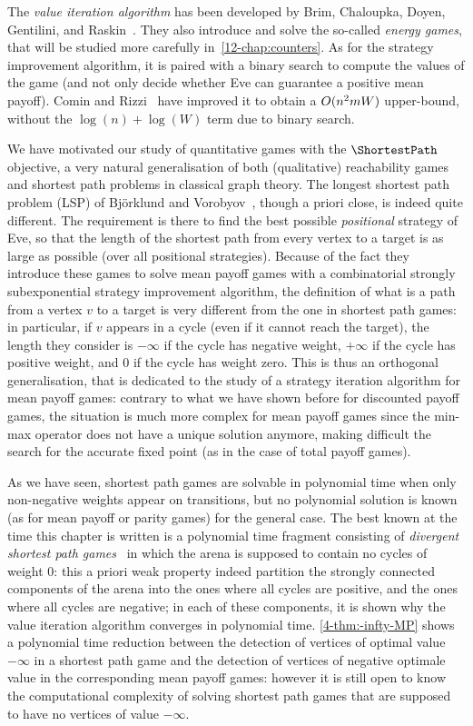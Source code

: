 The \emph{value iteration algorithm} has been developed by Brim,
Chaloupka, Doyen, Gentilini, and
Raskin~\cite{Brim&Chaloupka&Doyen&Gentilini&Raskin:2011}. They also
introduce and solve the so-called \emph{energy games}, that will be
studied more carefully in~\cref{12-chap:counters}. As for the strategy
improvement algorithm, it is paired with a binary search to compute
the values of the game (and not only decide whether Eve can guarantee
a positive mean payoff). Comin and Rizzi~\cite{Comin&Rizzi:2017} have
improved it to obtain a $O(n^2 m W)$ upper-bound, without
the $\log(n)+\log(W)$ term due to binary search.


We have motivated our study of quantitative games with the
$\ShortestPath$ objective, a very natural generalisation of both
(qualitative) reachability games and shortest path problems in
classical graph theory. The longest shortest path problem (LSP) of
Bj\"orklund and Vorobyov~\cite{Bjorklund&Vorobyov:2007}, though a
priori close, is indeed quite different. The requirement is there to
find the best possible \emph{positional} strategy of Eve, so that the
length of the shortest path from every vertex to a target is as large
as possible (over all positional strategies). Because of the fact they
introduce these games to solve mean payoff games with a combinatorial
strongly subexponential strategy improvement algorithm, the definition
of what is a path from a vertex $v$ to a target is very different from
the one in shortest path games: in particular, if $v$ appears in a
cycle (even if it cannot reach the target), the length they consider
is $-\infty$ if the cycle has negative weight, $+\infty$ if the cycle
has positive weight, and $0$ if the cycle has weight zero. This is
thus an orthogonal generalisation, that is dedicated to the study of a
strategy iteration algorithm for mean payoff games: contrary to what
we have shown before for discounted payoff games, the situation is
much more complex for mean payoff games since the min-max operator
does not have a unique solution anymore, making difficult the search
for the accurate fixed point (as in the case of total payoff games).

As we have seen, shortest path games are solvable in polynomial time
when only non-negative weights appear on transitions, but no
polynomial solution is known (as for mean payoff or parity games) for
the general case. The best known at the time this chapter is written
is a polynomial time fragment consisting of \emph{divergent
  shortest path games}~\cite{Busatto&Monmege&Reynier:2017} in which
the arena is supposed to contain no cycles of weight 0: this a priori
weak property indeed partition the strongly connected components of
the arena into the ones where all cycles are positive, and the ones
where all cycles are negative; in each of these components, it is
shown why the value iteration algorithm converges in polynomial
time. \cref{4-thm:-infty-MP} shows a polynomial time reduction between
the detection of vertices of optimal value $-\infty$ in a
shortest path game and the detection of vertices of negative optimale
value in the corresponding mean payoff games: however it is still open
to know the computational complexity of solving shortest path games
that are supposed to have no vertices of value $-\infty$.
